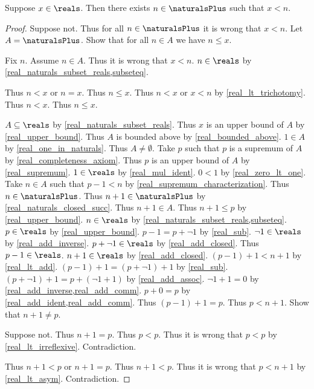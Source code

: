 \begin{theorem}\label{real_archimedean_property}
    Suppose $x\in\reals$.
    Then there exists $n\in\naturalsPlus$ such that $x < n$.
\end{theorem}
\begin{proof}
    Suppose not.
    Thus for all $n\in\naturalsPlus$ it is wrong that $x < n$.
    Let $A = \naturalsPlus$.
    Show that for all $n\in A$ we have $n \leq x$.
    \begin{subproof}
        Fix $n$.
        Assume $n\in A$.
        Thus it is wrong that $x < n$.
        $n\in\reals$ by \cref{real_naturals_subset_reals,subseteq}.
        \begin{byCase}
            Thus $n < x$ or $n = x$.
            Thus $n \leq x$.
            Thus $n < x$ or $x < n$ by \cref{real_lt_trichotomy}.
            Thus $n < x$.
            Thus $n \leq x$.
        \end{byCase}
    \end{subproof}
    $A\subseteq\reals$ by \cref{real_naturals_subset_reals}.
    Thus $x$ is an upper bound of $A$ by \cref{real_upper_bound}.
    Thus $A$ is bounded above by \cref{real_bounded_above}.
    $1\in A$ by \cref{real_one_in_naturals}.
    Thus $A\neq \emptyset$.
    Take $p$ such that $p$ is a supremum of $A$ by \cref{real_completeness_axiom}.
    Thus $p$ is an upper bound of $A$ by \cref{real_supremum}.
    $1\in\reals$ by \cref{real_mul_ident}.
    $0 < 1$ by \cref{real_zero_lt_one}.
    Take $n\in A$ such that $p - 1 < n$ by \cref{real_supremum_characterization}.
    Thus $n\in\naturalsPlus$.
    Thus $n + 1\in\naturalsPlus$ by \cref{real_naturals_closed_succ}.
    Thus $n + 1\in A$.
    Thus $n + 1 \leq p$ by \cref{real_upper_bound}.
    $n\in\reals$ by \cref{real_naturals_subset_reals,subseteq}.
    $p\in\reals$ by \cref{real_upper_bound}.
    $p - 1 = p + \neg{1}$ by \cref{real_sub}.
    $\neg{1}\in\reals$ by \cref{real_add_inverse}.
    $p + \neg{1}\in\reals$ by \cref{real_add_closed}.
    Thus $p - 1\in\reals$.
    $n + 1\in\reals$ by \cref{real_add_closed}.
    $(p - 1) + 1 < n + 1$ by \cref{real_lt_add}.
    $(p - 1) + 1 = (p + \neg{1}) + 1$ by \cref{real_sub}.
    $(p + \neg{1}) + 1 = p + (\neg{1} + 1)$ by \cref{real_add_assoc}.
    $\neg{1} + 1 = 0$ by \cref{real_add_inverse,real_add_comm}.
    $p + 0 = p$ by \cref{real_add_ident,real_add_comm}.
    Thus $(p - 1) + 1 = p$.
    Thus $p < n + 1$.
    Show that $n + 1 \neq p$.
    \begin{subproof}
        Suppose not.
        Thus $n + 1 = p$.
        Thus $p < p$.
        Thus it is wrong that $p < p$ by \cref{real_lt_irreflexive}.
        Contradiction.
    \end{subproof}
    Thus $n + 1 < p$ or $n + 1 = p$.
    Thus $n + 1 < p$.
    Thus it is wrong that $p < n + 1$ by \cref{real_lt_asym}.
    Contradiction.
\end{proof}


